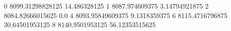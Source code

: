0 8099.31298828125 14.486328125
1 8087.974609375 3.14794921875
2 8084.82666015625 0.0
4 8093.95849609375 9.1318359375
6 8115.4716796875 30.64501953125
8 8140.9501953125 56.12353515625
